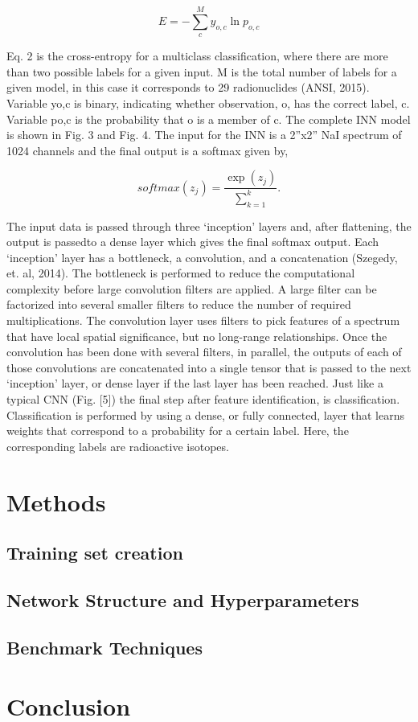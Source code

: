 \documentclass[11pt]{article}
\begin{document}
\begin{equation}
E = -\sum_{c}^{M}y_{o,c}\ln{p_{o,c}}
\end{equation}


Eq. 2 is the cross-entropy for a multiclass classification, where there are more than two possible labels 
for a given input. M is the total number of labels for a given model, in this case it corresponds to 29 
radionuclides (ANSI, 2015). Variable yo,c is binary, indicating whether observation, o, has the correct label, c. 
Variable po,c is the probability that o is a member of c. The complete INN model is shown in Fig. 3 and Fig. 4. 
The input for the INN is a 2”x2” NaI spectrum of 1024 channels and the final output is a softmax given by,

\begin{equation}
softmax(z_j) = \frac{\exp(z_j)}{\sum_{k=1}^{k}}.
\end{equation}

The input data is passed through three ‘inception’ layers and, after flattening, the output is passedto a dense layer which gives the final softmax output. 
Each ‘inception’ layer has a bottleneck, a convolution, and a concatenation (Szegedy, et. al, 2014).
The bottleneck is performed to reduce the computational complexity before large convolution filters are applied. 
A large filter can be factorized into several smaller filters to reduce the number of required multiplications. 
The convolution layer uses filters to pick features of a spectrum that have local spatial significance, but no long-range relationships. 
Once the convolution has been done with several filters, in parallel, the outputs of each of those convolutions are concatenated into a single tensor that is passed to the next ‘inception’ layer, or dense layer if the last layer has been reached. 
Just like a typical CNN (Fig. [5]) the final step after feature identification, is classification. 
Classification is performed by using a dense, or fully connected, layer that learns weights that correspond to a probability for a certain label. 
Here, the corresponding labels are radioactive isotopes.


\section{Methods}
\subsection{Training set creation}
\subsection{Network Structure and Hyperparameters}
\subsection{Benchmark Techniques}

\section{Conclusion}

\begin{thebibliography}{References}
\bibitem{}
\bibitem{}
\bibitem{}
\bibitem{}
\bibitem{}
\bibitem{}
\end{thebibliography}
\end{document}
